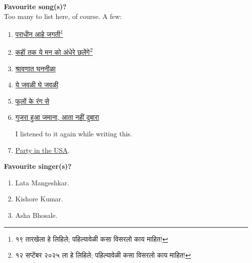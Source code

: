 \documentclass[17pt]{extarticle}  %
\begin{document}
\begin{enumerate}
\begin{english}
\item
\textbf{Favourite song(s)?}\\
Too many to list here, of course. A few:
\begin{enumerate}
\item \begin{marathi}\href{https://youtu.be/qc-Nj-39BJ4?si=f-JNw4ILa6B5vHVd&t=60}{पराधीन आहे जगती\footnote{१९ तारखेला हे लिहिले; पहिल्यावेळी कसा विसरलो काय माहित!}}\end{marathi}
\item \begin{marathi}\href{https://www.youtube.com/watch?v=fRlPQHFlfyc&list=RDfRlPQHFlfyc&start_radio=1&rv=7rebbrL8RO8}{कहाॅं तक ये मन को अंधेरे छलेंगे\footnote{१२ सप्टेंबर २०२५ ला हे लिहिले; पहिल्यावेळी कसा विसरलो काय माहित!}}\end{marathi}
\item \begin{marathi}\href{https://youtu.be/I9Ehun8Ahk4?si=mRLlBz0B9LF-880y}{श्रावणात घननीळा}\end{marathi}
\item\begin{marathi}\href{https://youtu.be/QjCdcO4t1qI?si=HYx-DluK-yfos_GU}{ये जवळी घे जवळी}\end{marathi}
\item \begin{marathi}\href{https://youtu.be/4CwFFWleNNA?si=ZL-2KpfQ4d7v4GRL}{फूलों के रंग से}\end{marathi}
\item \begin{marathi}\href{https://youtu.be/I2RefAyeVRA?si=RrVtDNg5ekkHvkSH}{गुजरा हुआ जमाना, आता नहीं दुबारा} \end{marathi} I listened to it again while writing this.
\item \href{https://youtu.be/M11SvDtPBhA?si=2zDFraxrFgbzlw7y}{Party in the USA}.
\end{enumerate}

\item \textbf{Favourite singer(s)?}\\
\begin{enumerate}
\item Lata Mangeshkar.
\item Kishore Kumar.
\item Asha Bhosale.
\end{enumerate}


\end{english}
\end{enumerate}
\end{document}
